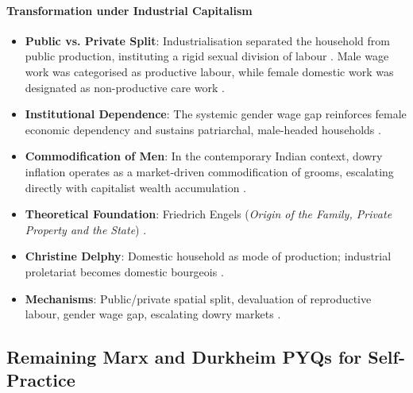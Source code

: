 \paragraph{Transformation under Industrial Capitalism}
\begin{itemize}
    \item \textbf{Public vs. Private Split}: Industrialisation separated the household from public production, instituting a rigid sexual division of labour . Male wage work was categorised as productive labour, while female domestic work was designated as non-productive care work .
    \item \textbf{Institutional Dependence}: The systemic gender wage gap reinforces female economic dependency and sustains patriarchal, male-headed households .
    \item \textbf{Commodification of Men}: In the contemporary Indian context, dowry inflation operates as a market-driven commodification of grooms, escalating directly with capitalist wealth accumulation .
\end{itemize}

\begin{QuickRevision}
\begin{itemize}
    \item \textbf{Theoretical Foundation}: Friedrich Engels (\textit{Origin of the Family, Private Property and the State}) .
    \item \textbf{Christine Delphy}: Domestic household as mode of production; industrial proletariat becomes domestic bourgeois .
    \item \textbf{Mechanisms}: Public/private spatial split, devaluation of reproductive labour, gender wage gap, escalating dowry markets .
\end{itemize}
\end{QuickRevision}

\subsection{Remaining Marx and Durkheim PYQs for Self-Practice}

